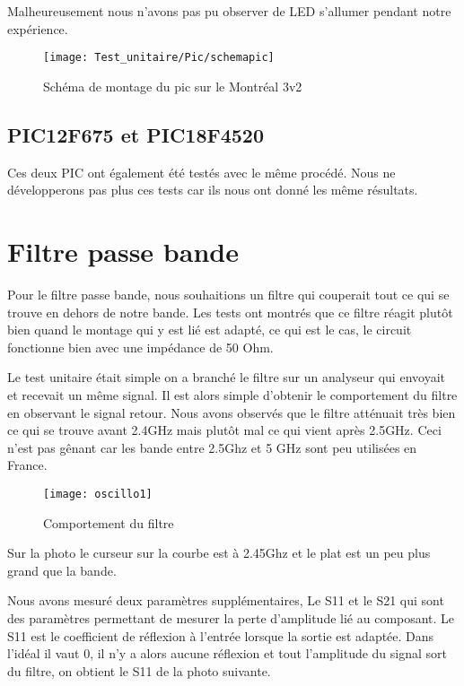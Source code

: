 Malheureusement nous n'avons pas pu observer de LED s'allumer pendant notre expérience.

\begin{figure}[!h]
  \centering
  \texttt{[image: Test\_unitaire/Pic/schemapic]}
  \caption{Schéma de montage du pic sur le Montréal 3v2}
  \label{fig:schemapic}
\end{figure}
\newpage
\subsection{PIC12F675 et PIC18F4520}
\label{sec:picclock}


Ces deux PIC ont également été testés avec le même procédé. Nous ne développerons pas plus ces tests car ils nous ont donné les même résultats.

\section{Filtre passe bande}
\label{sec:passe_bande}


Pour le filtre passe bande, nous souhaitions un filtre qui couperait tout ce qui se trouve en dehors de notre bande. Les tests ont montrés que ce filtre réagit plutôt bien quand le montage qui y est lié est adapté, ce qui est le cas, le circuit fonctionne bien avec une impédance de 50 Ohm.

Le test unitaire était simple on a branché le filtre sur un analyseur qui envoyait et recevait un même signal. Il est alors simple d’obtenir le comportement du filtre en observant le signal retour. Nous avons observés que le filtre atténuait très bien ce qui se trouve avant 2.4GHz mais plutôt mal ce qui vient après 2.5GHz. Ceci n’est pas gênant car les bande entre 2.5Ghz et 5 GHz sont peu utilisées en France. 

\begin{figure}[h]
  \centering
  \texttt{[image: oscillo1]}
  \caption{Comportement du filtre}
  \label{fig:comportement}
\end{figure}

Sur la photo le curseur sur la courbe est à 2.45Ghz et le plat est un peu plus grand que la bande.

Nous avons mesuré deux paramètres supplémentaires, Le S11 et le S21 qui sont des paramètres permettant de mesurer la perte d’amplitude lié au composant. Le S11 est le coefficient de réflexion à l'entrée lorsque la sortie est adaptée. Dans l’idéal il vaut 0, il n’y a alors aucune réflexion et tout l’amplitude du signal sort du filtre, on obtient le S11 de la photo suivante.

